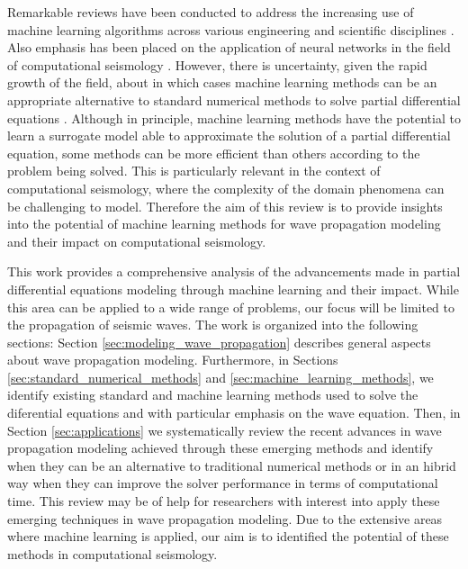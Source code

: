 \documentclass[11pt,twoside]{article}
\begin{document}
Remarkable reviews have been conducted to address the increasing use of machine learning algorithms across various 
engineering and scientific disciplines \citep{vadyala_review_2022,deng_physics-informed_2023,lino_current_2023}. 
Also emphasis has been placed on the application of neural networks in the field of computational seismology 
\citep{jingbo_research_2023}. However, there is uncertainty, given the rapid growth of the field, about in which 
cases machine learning methods can be an appropriate alternative to standard numerical methods to solve partial 
differential equations \citep{grossmann_can_2023,mcgreivy_weak_2024}. Although in principle, machine learning 
methods have the potential to learn a surrogate model able to approximate the solution of a partial differential 
equation, some methods can be more efficient than others according to the problem being solved. This is 
particularly relevant in the context of computational seismology, where the complexity of the domain phenomena can 
be challenging to model. Therefore the aim of this review is to provide insights into the potential of machine 
learning methods for wave propagation modeling and their impact on computational seismology.

This work provides a comprehensive analysis of the advancements made in partial differential equations modeling 
through machine learning and their impact. While this area can be applied to a wide range of problems, our focus 
will be limited to the propagation of seismic waves. The work is organized into the following sections: Section 
\ref{sec:modeling_wave_propagation} describes general aspects about wave propagation modeling. Furthermore, 
in Sections \ref{sec:standard_numerical_methods} and \ref{sec:machine_learning_methods}, we identify 
existing standard and machine learning methods used to solve the diferential equations and with particular emphasis 
on the wave equation. Then, in Section \ref{sec:applications} we systematically review the recent advances in wave 
propagation modeling achieved through these emerging methods and identify when they can be an alternative to 
traditional numerical methods or in an hibrid way when they can improve the solver performance in terms of 
computational time. This review may be of help for researchers with interest into apply 
these emerging techniques in wave propagation modeling. Due to the extensive areas where machine learning is 
applied, our aim is to identified the potential of these methods in computational seismology.

\end{document}
